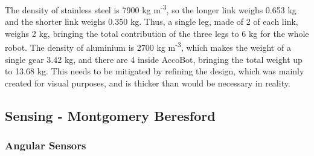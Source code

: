 \documentclass[11pt]{article}		%
\newcommand{\supercite}[1]{\textsuperscript{\cite{#1}}}		%
\begin{document}
				The density of stainless steel is 7900 kg m\textsuperscript{-3}\supercite{HLT}, so the longer link weighs 0.653 kg and the shorter link weighs 0.350 kg.
				Thus, a single leg, made of 2 of each link, weighs 2 kg, bringing the total contribution of the three legs to 6 kg for the whole robot.
				The density of aluminium is 2700 kg m\textsuperscript{-3}\supercite{HLT}, which makes the weight of a single gear 3.42 kg, and there are 4 inside AccoBot, bringing the total weight up to 13.68 kg.
				This needs to be mitigated by refining the design, which was mainly created for visual purposes, and is thicker than would be necessary in reality.
			
		\subsection[Sensing]{Sensing - Montgomery Beresford}
		
		\subsubsection{Angular Sensors}
            		
\end{document}
